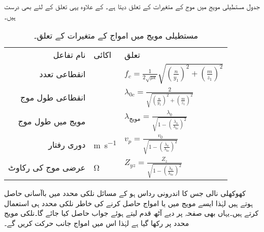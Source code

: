 
جدول  مستطیلی مویج میں  موج کے متغیرات کے تعلق دیتا ہے۔ کے علاوہ یہی تعلق  کے لئے بھی درست ہیں۔

\begin{table}[h!]
\caption{مستطیلی مویج میں  امواج کے متغیرات کے تعلق۔}
\centering
\begin{tabular}{rll}
نام تفاعل & اکائی& تعلق\\
انقطاعی تعدد & {\si{\hertz}} & $f_c=\frac{1}{2\sqrt{\mu \epsilon}}\sqrt{\left(\frac{n}{y_1}\right)^2+\left(\frac{m}{z_1}\right)^2}$\\
انقطاعی طول موج &  {\si{\meter}}& $ \lambda_{0c}=\frac{2}{\sqrt{\left(\frac{n}{y_1}\right)^2+\left(\frac{m}{z_1}\right)^2}}$\\
مویج میں طول موج& {\si{\meter}} & $\lambda_{\text{مویج}}=\frac{\lambda_0}{\sqrt{1-\left(\frac{\lambda_0}{\lambda_{0c}}\right)^2}}$\\
دوری رفتار & \si{\meter\per\second} & $v_p=\frac{v_0}{\sqrt{1-\left(\frac{\lambda_0}{\lambda_{0c}}\right)^2}}$\\
عرضی موج کی رکاوٹ & \si{\ohm} & $Z_{yz}=\frac{Z_z}{\sqrt{1-\left(\frac{\lambda_0}{\lambda_{0c}}\right)^2}}$
\end{tabular}
\label{جدول_مویج_مستطیلی_مویج_تعلق}
\end{table}

کھوکھلی نالی جس کا اندرونی رداس  ہو کے مسائل نلکی محدد میں باآسانی حاصل ہوتے ہیں لہٰذا ایسے مویج میں  یا  امواج حاصل کرنے کی خاطر نلکی محدد ہی استعمال کرتے ہیں۔یہاں بھی صفحہ  پر دیے آٹھ قدم  لیتے ہوئے جواب حاصل کیا جائے گا۔نلکی مویج  محدد پر رکھا گیا ہے لہٰذا اس  میں امواج  جانب حرکت کریں گے۔


